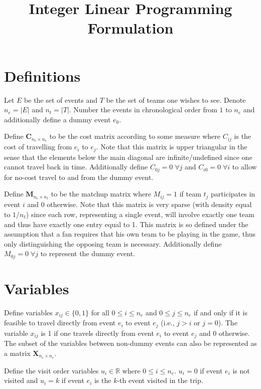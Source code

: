 \documentclass[11pt]{article}
\title{Integer Linear Programming Formulation}
\date{}
\begin{document}
\maketitle

\section{Definitions}
Let $E$ be the set of events and $T$ be the set of teams one wishes to see. Denote $n_e = |E|$ and $n_t = |T|$. Number the events in chronological order from $1$ to $n_e$ and additionally define a dummy event $e_0$.

Define $\mathbf{C}_{n_e \times n_e}$ to be the cost matrix according to some measure where $C_{ij}$ is the cost of travelling from $e_i$ to $e_j$. Note that this matrix is upper triangular in the sense that the elements below the main diagonal are infinite/undefined since one cannot travel back in time. Additionally define $C_{0j} = 0 \; \forall j$ and $C_{i0} = 0 \; \forall i$ to allow for no-cost travel to and from the dummy event.

Define $\mathbf{M}_{n_e \times n_t}$ to be the matchup matrix where $M_{ij} = 1$ if team $t_j$ participates in event $i$ and 0 otherwise. Note that this matrix is very sparse (with density equal to $1/n_t$) since each row, representing a single event, will involve exactly one team and thus have exactly one entry equal to 1. This matrix is so defined under the assumption that a fan requires that his own team to be playing in the game, thus only distinguishing the opposing team is necessary. Additionally define $M_{0j} = 0 \; \forall j$ to represent the dummy event.

\section{Variables}
Define variables $x_{ij} \in \{0, 1\}$ for all $0 \leq i \leq n_e$ and $0 \leq j \leq n_e$ if and only if it is feasible to travel directly from event $e_i$ to event $e_j$ (i.e., $j > i$ or $j = 0$). The variable $x_{ij}$ is 1 if one travels directly from event $e_i$ to event $e_j$ and 0 otherwise. The subset of the variables between non-dummy events can also be represented as a matrix $\mathbf{X}_{n_e \times n_e}$.

Define the visit order variables $u_i \in \mathbb{R}$ where $0 \leq i \leq n_e$. $u_i = 0$ if event $e_i$ is not visited and $u_i = k$ if event $e_i$ is the $k$-th event visited in the trip.
\end{document}
